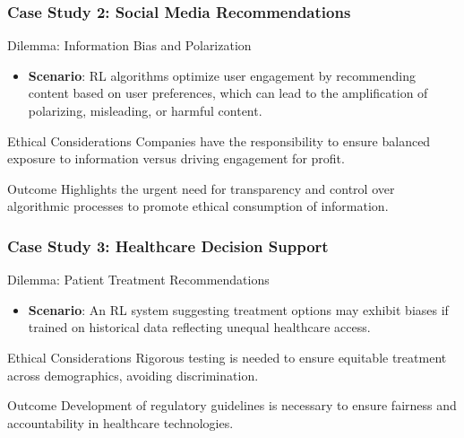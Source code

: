 \documentclass[aspectratio=169]{beamer}
\begin{document}
\begin{frame}[fragile]
    \frametitle{Case Study 2: Social Media Recommendations}
    \begin{block}{Dilemma: Information Bias and Polarization}
        \begin{itemize}
            \item \textbf{Scenario}: RL algorithms optimize user engagement by recommending content based on user preferences, which can lead to the amplification of polarizing, misleading, or harmful content.
        \end{itemize}
    \end{block}
    
    \begin{block}{Ethical Considerations}
        Companies have the responsibility to ensure balanced exposure to information versus driving engagement for profit.
    \end{block}
    
    \begin{block}{Outcome}
        Highlights the urgent need for transparency and control over algorithmic processes to promote ethical consumption of information.
    \end{block}
\end{frame}

\begin{frame}[fragile]
    \frametitle{Case Study 3: Healthcare Decision Support}
    \begin{block}{Dilemma: Patient Treatment Recommendations}
        \begin{itemize}
            \item \textbf{Scenario}: An RL system suggesting treatment options may exhibit biases if trained on historical data reflecting unequal healthcare access.
        \end{itemize}
    \end{block}
    
    \begin{block}{Ethical Considerations}
        Rigorous testing is needed to ensure equitable treatment across demographics, avoiding discrimination.
    \end{block}
    
    \begin{block}{Outcome}
        Development of regulatory guidelines is necessary to ensure fairness and accountability in healthcare technologies.
    \end{block}
\end{frame}
\end{document}

